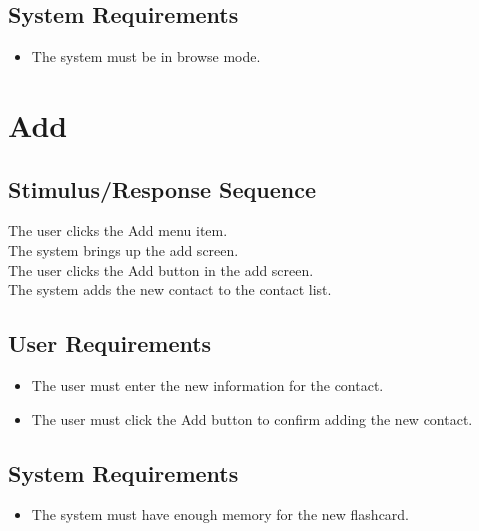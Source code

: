 \documentclass{scrreprt}
\newcommand{\smallspace}{\vspace{0.5cm}}
\begin{document}
    \subsection{System Requirements}
        \begin{itemize}
            \item The system must be in browse mode.
        \end{itemize}

\section{Add}
    \subsection{Stimulus/Response Sequence}
        \begin{flushleft}
             The user clicks the Add menu item. \\
             The system brings up the add screen. \\
            \smallspace
             The user clicks the Add button in the add screen. \\
             The system adds the new contact to the contact list. \\
        \end{flushleft}

    \subsection{User Requirements}
        \begin{itemize}
            \item The user must enter the new information for the contact.
            \item The user must click the Add button to confirm adding the new contact.
        \end{itemize}

    \subsection{System Requirements}
        \begin{itemize}
            \item The system must have enough memory for the new flashcard.
        \end{itemize}
\end{document}
